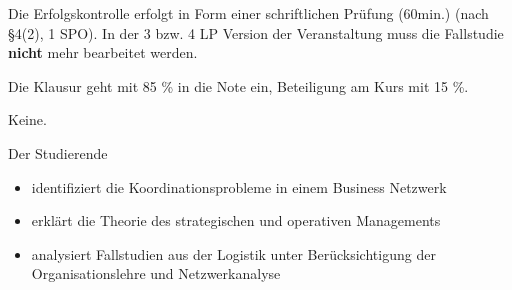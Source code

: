 \begin{course}

\setdoclanguagegerman
{}



\coursehead


\label{cour_8445.dp_997}


\begin{styleenv}
\begin{assessment}
Die Erfolgskontrolle erfolgt in Form einer schriftlichen Prüfung (60min.) (nach §4(2), 1 SPO). In der 3 bzw. 4 LP Version der Veranstaltung muss die Fallstudie \textbf{nicht }mehr bearbeitet werden.

 

Die Klausur geht mit 85 \% in die Note ein, Beteiligung am Kurs mit 15 \%.


\end{assessment}

\begin{conditions}Keine.\end{conditions}


\end{styleenv}

\begin{learningoutcomes}
Der Studierende

 \begin{itemize}\item identifiziert die Koordinationsprobleme in einem Business Netzwerk  \item erklärt die Theorie des strategischen und operativen Managements  \item analysiert Fallstudien aus der Logistik unter Berücksichtigung der Organisationslehre und Netzwerkanalyse  \end{itemize}
\end{learningoutcomes}


\end{course}
